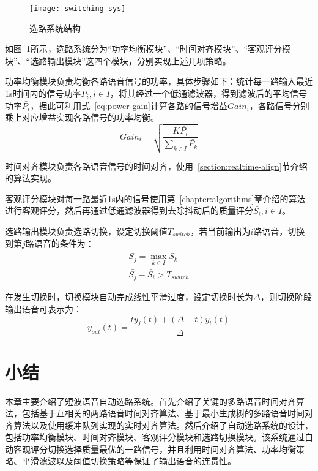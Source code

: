 \begin{figure}
\centering
\texttt{[image: switching-sys]}
\caption{选路系统结构\label{fig:switching-sys}}
\end{figure}

如图~\ref{fig:switching-sys}所示，选路系统分为“功率均衡模块”、“时间对齐模块”、“客观评分模块”、“选路输出模块”这四个模块，分别实现上述几项策略。

功率均衡模块负责均衡各路语音信号的功率，具体步骤如下：统计每一路输入最近1s时间内的信号功率$P_i, i \in I$，将其经过一个低通滤波器，得到滤波后的平均信号功率$\bar{P_i}$，据此可利用式~\ref{eq:power-gain}计算各路的信号增益$Gain_i$，各路信号分别乘上对应增益实现各路信号的功率均衡。
\begin{equation}\label{eq:power-gain}
Gain_i = \sqrt{\frac {K\bar{P_i}} {\sum_{k \in I}{\bar{P_k}}} }
\end{equation}

时间对齐模块负责各路语音信号的时间对齐，使用~\ref{section:realtime-align}节介绍的算法实现。

客观评分模块对每一路最近1s内的信号使用第~\ref{chapter:algorithms}章介绍的算法进行客观评分，然后再通过低通滤波器得到去除抖动后的质量评分$\bar{S_i}, i \in I$。

选路输出模块负责选路切换，设定切换阈值$T_{switch}$，若当前输出为$i$路语音，切换到第$j$路语音的条件为：
\begin{equation}
\begin{array}{l}
\bar{S_j} = \max\limits_{k \in I} \bar{S_k} \\
\bar{S_j} - \bar{S_i} > T_{switch}
\end{array}
\end{equation}

在发生切换时，切换模块自动完成线性平滑过度，设定切换时长为$\Delta$，则切换阶段输出语音可表示为：
\begin{equation}
y_{out}(t) = \frac{ty_j(t)+(\Delta-t)y_i(t)}{\Delta}
\end{equation}

\section{小结}

本章主要介绍了短波语音自动选路系统。首先介绍了关键的多路语音时间对齐算法，包括基于互相关的两路语音时间对齐算法、基于最小生成树的多路语音时间对齐算法以及使用缓冲队列实现的实时对齐算法。然后介绍了自动选路系统的设计，包括功率均衡模块、时间对齐模块、客观评分模块和选路切换模块。该系统通过自动客观评分切换选择质量最优的一路信号，并且利用时间对齐算法、功率均衡策略、平滑滤波以及阈值切换策略等保证了输出语音的连贯性。
